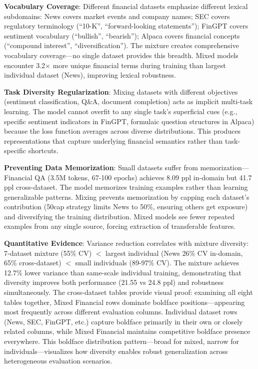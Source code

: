 \textbf{Vocabulary Coverage}: Different financial datasets emphasize different lexical subdomains: News covers market events and company names; SEC covers regulatory terminology (``10-K'', ``forward-looking statements''); FinGPT covers sentiment vocabulary (``bullish'', ``bearish''); Alpaca covers financial concepts (``compound interest'', ``diversification''). The mixture creates comprehensive vocabulary coverage—no single dataset provides this breadth. Mixed models encounter 3.2$\times$ more unique financial terms during training than largest individual dataset (News), improving lexical robustness.

\textbf{Task Diversity Regularization}: Mixing datasets with different objectives (sentiment classification, Q\&A, document completion) acts as implicit multi-task learning. The model cannot overfit to any single task's superficial cues (e.g., specific sentiment indicators in FinGPT, formulaic question structures in Alpaca) because the loss function averages across diverse distributions. This produces representations that capture underlying financial semantics rather than task-specific shortcuts.

\textbf{Preventing Data Memorization}: Small datasets suffer from memorization—Financial QA (3.5M tokens, 67-100 epochs) achieves 8.09 ppl in-domain but 41.7 ppl cross-dataset. The model memorizes training examples rather than learning generalizable patterns. Mixing prevents memorization by capping each dataset's contribution (50cap strategy limits News to 50\%, ensuring others get exposure) and diversifying the training distribution. Mixed models see fewer repeated examples from any single source, forcing extraction of transferable features.

\textbf{Quantitative Evidence}: Variance reduction correlates with mixture diversity: 7-dataset mixture (55\% CV) $<$ largest individual (News 26\% CV in-domain, 65\% cross-dataset) $<$ small individuals (89-97\% CV). The mixture achieves 12.7\% lower variance than same-scale individual training, demonstrating that diversity improves both performance (21.55 vs 24.8 ppl) and robustness simultaneously. The cross-dataset tables provide visual proof: examining all eight tables together, Mixed Financial rows dominate boldface positions—appearing most frequently across different evaluation columns. Individual dataset rows (News, SEC, FinGPT, etc.) capture boldface primarily in their own or closely related columns, while Mixed Financial maintains competitive boldface presence everywhere. This boldface distribution pattern—broad for mixed, narrow for individuals—visualizes how diversity enables robust generalization across heterogeneous evaluation scenarios.


